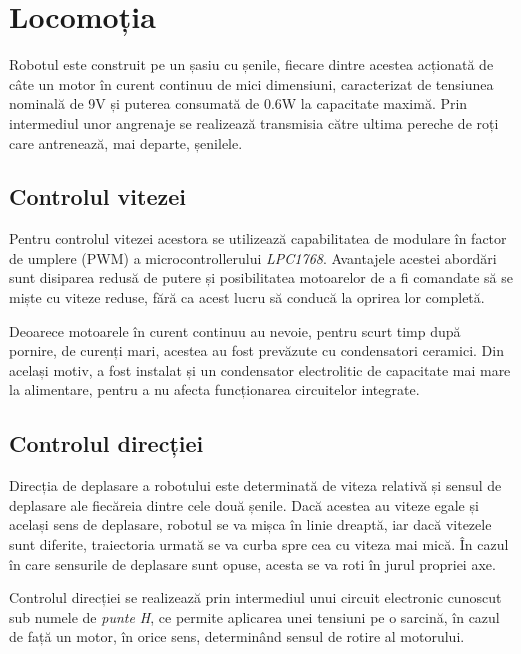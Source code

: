 \section{Locomoția}

Robotul este construit pe un șasiu cu șenile, fiecare dintre acestea acționată de câte un motor în curent continuu de mici dimensiuni, caracterizat de tensiunea nominală de 9V și puterea consumată de 0.6W la capacitate maximă. Prin intermediul unor angrenaje se realizează transmisia către ultima pereche de roți care antrenează, mai departe, șenilele.


\subsection{Controlul vitezei}

Pentru controlul vitezei acestora se utilizează capabilitatea de modulare în factor de umplere (PWM) a microcontrollerului \textit{LPC1768}. Avantajele acestei abordări sunt disiparea redusă de putere și posibilitatea motoarelor de a fi comandate să se miște cu viteze reduse, fără ca acest lucru să conducă la oprirea lor completă.

Deoarece motoarele în curent continuu au nevoie, pentru scurt timp după pornire, de curenți mari, acestea au fost prevăzute cu condensatori ceramici. Din același motiv, a fost instalat și un condensator electrolitic de capacitate mai mare la alimentare, pentru a nu afecta funcționarea circuitelor integrate.

\subsection{Controlul direcției}

Direcția de deplasare a robotului este determinată de viteza relativă și sensul de deplasare ale fiecăreia dintre cele două șenile. Dacă acestea au viteze egale și același sens de deplasare, robotul se va mișca în linie dreaptă, iar dacă vitezele sunt diferite, traiectoria urmată se va curba spre cea cu viteza mai mică. În cazul în care sensurile de deplasare sunt opuse, acesta se va roti în jurul propriei axe.

Controlul direcției se realizează prin intermediul unui circuit electronic cunoscut sub numele de \textit{punte H}, ce permite aplicarea unei tensiuni pe o sarcină, în cazul de față un motor, în orice sens, determinând sensul de rotire al motorului.

